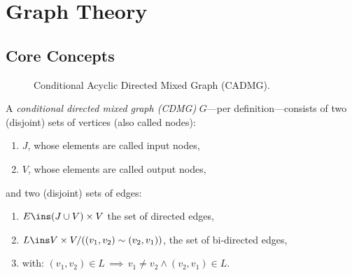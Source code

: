 \section{Graph Theory}

\subsection{Core Concepts}

\begin{figure}[ht]
\centering
{}
\caption{Conditional Acyclic Directed Mixed Graph (CADMG).}
\label{fig:cadmg}
\end{figure}


\begin{Def}
    \label{def-cdmg}
    A \emph{conditional directed mixed graph (CDMG)} $G$---per definition---consists of two (disjoint) sets of
    vertices (also called nodes):
    \begin{enumerate}[label=\roman*.)]
        \item $J$, whose elements are called input nodes,
        \item $V$, whose elements are called output nodes,
    \end{enumerate}
    and two (disjoint) sets of edges:
    \begin{enumerate}[resume,label=\roman*.)]
        \item $E \ins (J \cup V) \times V$ the set of directed edges,
        \item $L \ins V \times V/((v_1,v_2) \sim (v_2,v_1)) $, the set of bi-directed edges, 
        \item[]    with: $(v_1,v_2) \in L \, \implies\, v_1\neq v_2 \land (v_2,v_1) \in L$.
    \end{enumerate}
\end{Def}

